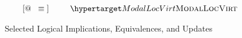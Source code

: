 \begin{figure}
\[\begin{array}{r@{\;}c@{\;}lll}
\modaldef
& \logequiv &
\modaldefunfold
&& \TirNameStyle{ModalLocVirt}
\end{array}\]
\caption{Selected Logical Implications, Equivalences, and Updates}
\label{fig:laws}
\end{figure}
